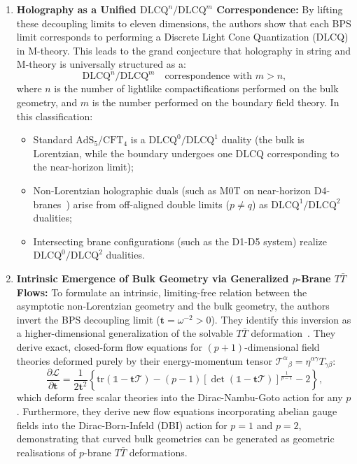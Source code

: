 \documentclass[11pt,a4paper]{article}
\newcommand{\CT}{\mathcal{T}}
\newcommand{\CL}{\mathcal{L}}
\begin{document}
\begin{enumerate}
    \item \textbf{Holography as a Unified $\text{DLCQ}^n / \text{DLCQ}^m$ Correspondence:}
    By lifting these decoupling limits to eleven dimensions, the authors show that each BPS limit corresponds to performing a Discrete Light Cone Quantization (DLCQ) in M-theory. This leads to the grand conjecture that holography in string and M-theory is universally structured as a:
    \begin{equation}
        \text{DLCQ}^n / \text{DLCQ}^m \quad \text{correspondence with } m > n,
    \end{equation}
    where $n$ is the number of lightlike compactifications performed on the bulk geometry, and $m$ is the number performed on the boundary field theory. In this classification:
    \begin{itemize}
        \item Standard $\text{AdS}_5/\text{CFT}_4$ is a $\text{DLCQ}^0/\text{DLCQ}^1$ duality (the bulk is Lorentzian, while the boundary undergoes one DLCQ corresponding to the near-horizon limit);
        \item Non-Lorentzian holographic duals (such as M0T on near-horizon D4-branes~\cite{Lambert:2024yjk}) arise from off-aligned double limits ($p \neq q$) as $\text{DLCQ}^1/\text{DLCQ}^2$ dualities;
        \item Intersecting brane configurations (such as the D1-D5 system) realize $\text{DLCQ}^0/\text{DLCQ}^2$ dualities.
    \end{itemize}

    \item \textbf{Intrinsic Emergence of Bulk Geometry via Generalized $p$-Brane $T\bar{T}$ Flows:}
    To formulate an intrinsic, limiting-free relation between the asymptotic non-Lorentzian geometry and the bulk geometry, the authors invert the BPS decoupling limit ($\mathbf{t} = \omega^{-2} > 0$). They identify this inversion as a higher-dimensional generalization of the solvable $T\bar{T}$ deformation~\cite{Zamolodchikov:2004ce,Smirnov:2016lqw,Blair:2020ops}. They derive exact, closed-form flow equations for $(p+1)$-dimensional field theories deformed purely by their energy-momentum tensor $\CT^\alpha{}_\beta = \eta^{\alpha\gamma} T_{\gamma\beta}$:
    \begin{equation}
        \label{eq:scalar_flow}
        \frac{\partial \CL}{\partial \mathbf{t}} = \frac{1}{2\mathbf{t}^2} \left\{ \mathrm{tr}(\mathbb{1} - \mathbf{t}\CT) - (p-1) \left[ \det(\mathbb{1} - \mathbf{t}\CT) \right]^{\frac{1}{p-1}} - 2 \right\},
    \end{equation}
    which deform free scalar theories into the Dirac-Nambu-Goto action for any $p$. Furthermore, they derive new flow equations incorporating abelian gauge fields into the Dirac-Born-Infeld (DBI) action for $p=1$ and $p=2$, demonstrating that curved bulk geometries can be generated as geometric realisations of $p$-brane $T\bar{T}$ deformations.
\end{enumerate}
\end{document}
